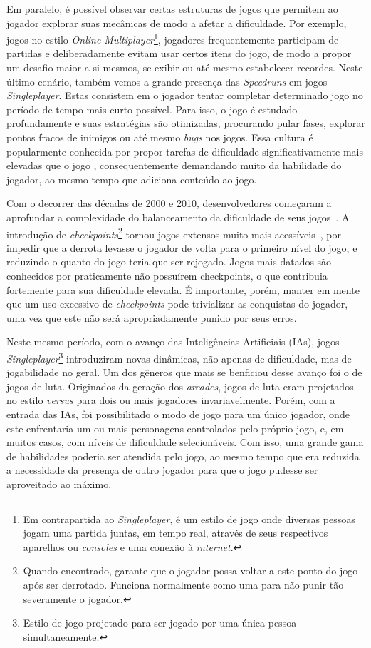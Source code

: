 Em paralelo, é possível observar certas estruturas de jogos que permitem ao jogador explorar suas mecânicas de modo a afetar a dificuldade. Por exemplo, jogos no estilo \textit{Online Multiplayer}\footnote{
    Em contrapartida ao \textit{Singleplayer}, é um estilo de jogo onde diversas pessoas jogam uma partida juntas, em tempo real, através de seus respectivos aparelhos ou \textit{consoles} e uma conexão à \textit{internet}.
}, jogadores frequentemente participam de partidas e deliberadamente evitam usar certos itens do jogo, de modo a propor um desafio maior a si mesmos, se exibir ou até mesmo estabelecer recordes. Neste último cenário, também vemos a grande presença das \textit{Speedruns} em jogos \textit{Singleplayer}. Estas consistem em o jogador tentar completar determinado jogo no período de tempo mais curto possível. Para isso, o jogo é estudado profundamente e suas estratégias são otimizadas, procurando pular fases, explorar pontos fracos de inimigos ou até mesmo \textit{bugs} nos jogos. Essa cultura é popularmente conhecida por propor tarefas de dificuldade significativamente mais elevadas que o jogo \textquotedbl{}, consequentemente demandando muito da habilidade do jogador, ao mesmo tempo que adiciona conteúdo ao jogo.

Com o decorrer das décadas de 2000 e 2010, desenvolvedores começaram a aprofundar a complexidade do balanceamento da dificuldade de seus jogos~\citep{Zork:81}. A introdução de \textit{checkpoints}\footnote{
    Quando encontrado, garante que o jogador possa voltar a este ponto do jogo após ser derrotado. Funciona normalmente como uma \textquotedbl{} para não punir tão severamente o jogador.
} tornou jogos extensos muito mais acessíveis~\citep{GameTime}, por impedir que a derrota levasse o jogador de volta para o primeiro nível do jogo, e reduzindo o quanto do jogo teria que ser rejogado. Jogos mais datados são conhecidos por praticamente não possuírem checkpoints, o que contribuia fortemente para sua dificuldade elevada. É importante, porém, manter em mente que um uso excessivo de \textit{checkpoints} pode trivializar as conquistas do jogador, uma vez que este não será apropriadamente punido por seus erros.

Neste mesmo período, com o avanço das Inteligências Artificiais (IAs), jogos \textit{Singleplayer}\footnote{
    Estilo de jogo projetado para ser jogado por uma única pessoa simultaneamente.
} introduziram novas dinâmicas, não apenas de dificuldade, mas de jogabilidade no geral. Um dos gêneros que mais se benficiou desse avanço foi o de jogos de luta. Originados da geração dos \textit{arcades}, jogos de luta eram projetados no estilo \textit{versus} para dois ou mais jogadores invariavelmente. Porém, com a entrada das IAs, foi possibilitado o modo de jogo para um único jogador, onde este enfrentaria um ou mais personagens controlados pelo próprio jogo, e, em muitos casos, com níveis de dificuldade selecionáveis. Com isso, uma grande gama de habilidades poderia ser atendida pelo jogo, ao mesmo tempo que era reduzida a necessidade da presença de outro jogador para que o jogo pudesse ser aproveitado ao máximo.

